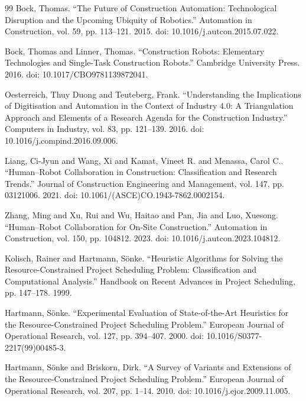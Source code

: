 \documentclass[preprint,12pt]{elsarticle}
\begin{document}
\begin{thebibliography}{99}
 Bock, Thomas. ``The Future of Construction Automation: Technological Disruption and the Upcoming Ubiquity of Robotics.'' Automation in Construction, vol. 59, pp. 113--121. 2015. doi: 10.1016/j.autcon.2015.07.022.

 Bock, Thomas and Linner, Thomas. ``Construction Robots: Elementary Technologies and Single-Task Construction Robots.'' Cambridge University Press. 2016. doi: 10.1017/CBO9781139872041.

 Oesterreich, Thuy Duong and Teuteberg, Frank. ``Understanding the Implications of Digitisation and Automation in the Context of Industry 4.0: A Triangulation Approach and Elements of a Research Agenda for the Construction Industry.'' Computers in Industry, vol. 83, pp. 121--139. 2016. doi: 10.1016/j.compind.2016.09.006.

 Liang, Ci-Jyun and Wang, Xi and Kamat, Vineet R. and Menassa, Carol C.. ``Human--Robot Collaboration in Construction: Classification and Research Trends.'' Journal of Construction Engineering and Management, vol. 147, pp. 03121006. 2021. doi: 10.1061/(ASCE)CO.1943-7862.0002154.

 Zhang, Ming and Xu, Rui and Wu, Haitao and Pan, Jia and Luo, Xuesong. ``Human--Robot Collaboration for On-Site Construction.'' Automation in Construction, vol. 150, pp. 104812. 2023. doi: 10.1016/j.autcon.2023.104812.

 Kolisch, Rainer and Hartmann, S\"onke. ``Heuristic Algorithms for Solving the Resource-Constrained Project Scheduling Problem: Classification and Computational Analysis.'' Handbook on Recent Advances in Project Scheduling, pp. 147--178. 1999.

 Hartmann, S\"onke. ``Experimental Evaluation of State-of-the-Art Heuristics for the Resource-Constrained Project Scheduling Problem.'' European Journal of Operational Research, vol. 127, pp. 394--407. 2000. doi: 10.1016/S0377-2217(99)00485-3.

 Hartmann, S\"onke and Briskorn, Dirk. ``A Survey of Variants and Extensions of the Resource-Constrained Project Scheduling Problem.'' European Journal of Operational Research, vol. 207, pp. 1--14. 2010. doi: 10.1016/j.ejor.2009.11.005.


\end{thebibliography}
\end{document}
